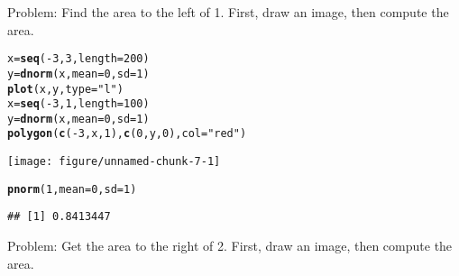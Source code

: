 \documentclass{article}\usepackage[]{graphicx}\usepackage[]{xcolor}
\makeatletter
\def\maxwidth{ %
  \ifdim\Gin@nat@width>\linewidth
    \linewidth
  \else
    \Gin@nat@width
  \fi
}
\newcommand{\hlnum}[1]{\textcolor[rgb]{0.686,0.059,0.569}{#1}}%
\newcommand{\hlsng}[1]{\textcolor[rgb]{0.192,0.494,0.8}{#1}}%
\newcommand{\hlopt}[1]{\textcolor[rgb]{0,0,0}{#1}}%
\newcommand{\hldef}[1]{\textcolor[rgb]{0.345,0.345,0.345}{#1}}%
\newcommand{\hlkwb}[1]{\textcolor[rgb]{0.69,0.353,0.396}{#1}}%
\newcommand{\hlkwc}[1]{\textcolor[rgb]{0.333,0.667,0.333}{#1}}%
\newcommand{\hlkwd}[1]{\textcolor[rgb]{0.737,0.353,0.396}{\textbf{#1}}}%
\newenvironment{kframe}{%
 \def\at@end@of@kframe{}%
 \ifinner\ifhmode%
  \def\at@end@of@kframe{\end{minipage}}%
  \begin{minipage}{\columnwidth}%
 \fi\fi%
 \def\FrameCommand##1{\hskip\@totalleftmargin \hskip-\fboxsep
 \colorbox{shadecolor}{##1}\hskip-\fboxsep
     \hskip-\linewidth \hskip-\@totalleftmargin \hskip\columnwidth}%
 \MakeFramed {\advance\hsize-\width
   \@totalleftmargin\z@ \linewidth\hsize
   \@setminipage}}%
 {\par\unskip\endMakeFramed%
 \at@end@of@kframe}
\newenvironment{knitrout}{}{} %
\makeatother
\begin{document}
Problem: \newline 
Find the area to the left of 1. First, draw an image, then compute the area.
\begin{knitrout}
\color{fgcolor}\begin{kframe}
\begin{alltt}
\hldef{x}\hlkwb{=}\hlkwd{seq}\hldef{(}\hlopt{-}\hlnum{3}\hldef{,}\hlnum{3}\hldef{,}\hlkwc{length}\hldef{=}\hlnum{200}\hldef{)}
\hldef{y}\hlkwb{=}\hlkwd{dnorm}\hldef{(x,}\hlkwc{mean}\hldef{=}\hlnum{0}\hldef{,}\hlkwc{sd}\hldef{=}\hlnum{1}\hldef{)}
\hlkwd{plot}\hldef{(x,y,}\hlkwc{type}\hldef{=}\hlsng{"l"}\hldef{)}
\hldef{x}\hlkwb{=}\hlkwd{seq}\hldef{(}\hlopt{-}\hlnum{3}\hldef{,}\hlnum{1}\hldef{,}\hlkwc{length}\hldef{=}\hlnum{100}\hldef{)}
\hldef{y}\hlkwb{=}\hlkwd{dnorm}\hldef{(x,}\hlkwc{mean}\hldef{=}\hlnum{0}\hldef{,}\hlkwc{sd}\hldef{=}\hlnum{1}\hldef{)}
\hlkwd{polygon}\hldef{(}\hlkwd{c}\hldef{(}\hlopt{-}\hlnum{3}\hldef{,x,}\hlnum{1}\hldef{),}\hlkwd{c}\hldef{(}\hlnum{0}\hldef{,y,}\hlnum{0}\hldef{),}\hlkwc{col}\hldef{=}\hlsng{"red"}\hldef{)}
\end{alltt}
\end{kframe}
\texttt{[image: figure/unnamed-chunk-7-1]} 
\begin{kframe}\begin{alltt}
\hlkwd{pnorm}\hldef{(}\hlnum{1}\hldef{,}\hlkwc{mean}\hldef{=}\hlnum{0}\hldef{,}\hlkwc{sd}\hldef{=}\hlnum{1}\hldef{)}
\end{alltt}
\begin{verbatim}
## [1] 0.8413447
\end{verbatim}
\end{kframe}
\end{knitrout}
Problem: \newline 
Get the area to the right of 2. First, draw an image, then compute the area.
\end{document}
